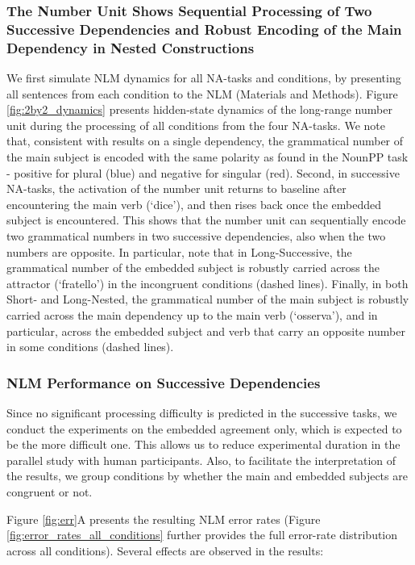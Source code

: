 \subsubsection{The Number Unit Shows Sequential Processing of Two Successive Dependencies and Robust Encoding of the Main Dependency in Nested Constructions}
We first simulate NLM dynamics for all NA-tasks and conditions, by presenting all sentences from each condition to the NLM (Materials and Methods). Figure \ref{fig:2by2_dynamics} presents hidden-state dynamics of the long-range number unit during the processing of all conditions from the four NA-tasks. We note that, consistent with results on a single dependency, the grammatical number of the main subject is encoded with the same polarity as found in the NounPP task - positive for plural (blue) and negative for singular (red). Second, in successive NA-tasks, the activation of the number unit returns to baseline after encountering the main verb (`dice'), and then rises back once the embedded subject is encountered. This shows that the number unit can sequentially encode two grammatical numbers in two successive dependencies, also when the two numbers are opposite. In particular, note that in Long-Successive, the grammatical number of the embedded subject is robustly carried across the attractor (`fratello') in the incongruent conditions (dashed lines). Finally, in both Short- and Long-Nested, the grammatical number of the main subject is robustly carried across the main dependency up to the main verb (`osserva'), and in particular, across the embedded subject and verb that carry an opposite number in some conditions (dashed lines).

\subsubsection{NLM Performance on Successive Dependencies}
Since no significant processing difficulty is predicted in the successive tasks, we conduct the experiments on the embedded agreement only, which is expected to be the more difficult one. 
This allows us to reduce experimental duration in the parallel study with human participants. Also, to facilitate the interpretation of the results, we group conditions by whether the main and embedded subjects are congruent or not.

Figure \ref{fig:err}A presents the resulting NLM error rates (Figure \ref{fig:error_rates_all_conditions} further provides the full error-rate distribution across all conditions). Several effects are observed in the results: 

